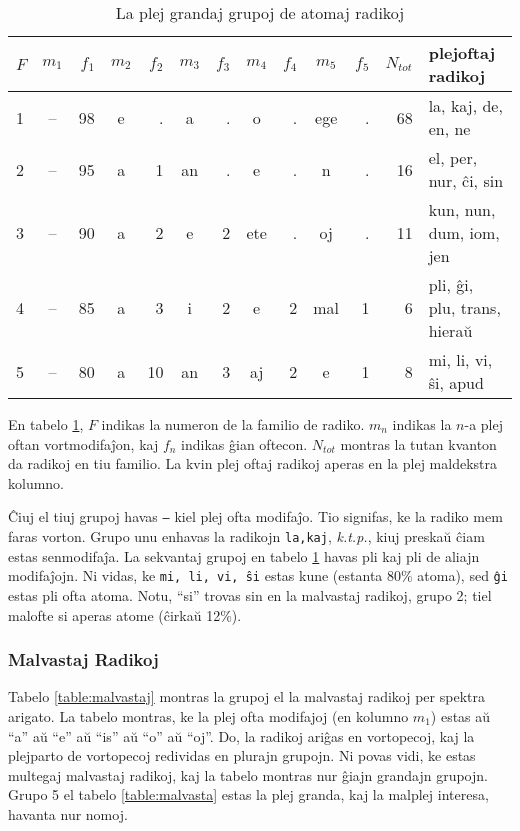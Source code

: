 \documentclass[12pt,twoside]{article}
\begin{document}
\vspace{.2 in}
\begin{table}[h!]
\begin{center}
\begin{tabular}{ |l||c|r||c|r||c|r||c|r||c|r||r|l| }
\hline
$F$& $m_1$ & $f_1$&$m_2$ & $f_2$&$m_3$ & $f_3$& $m_4$  & $f_4$& $m_5$ & $f_5$& $N_{tot}$ &   plejoftaj radikoj     \\
\hline
1   &--  &98   &e    &.   &a    &.    &o    &.  &ege    &.  &68          &la, kaj, de, en, ne \\
2   &--  &95   &a    &1  &an    &.    &e    &.    &n    &.  &16        &el, per, nur, ĉi, sin \\
3   &--  &90   &a    &2   &e    &2  &ete    &.   &oj    &.  &11      &kun, nun, dum, iom, jen \\
4   &--  &85   &a    &3   &i    &2    &e    &2  &mal    &1   &6  &pli, ĝi, plu, trans, hieraŭ \\
5   &--  &80   &a   &10  &an    &3   &aj    &2    &e    &1   &8         &mi, li, vi, ŝi, apud \\
\hline
\end{tabular}
\caption{La plej grandaj grupoj de atomaj radikoj}\label{table:atomoj}
\end{center}
\end{table}
\vspace{.2 in}

En tabelo \ref{table:atomoj}, $F$ indikas la numeron de la familio de radiko. $m_n$ indikas la $n$-a plej oftan vortmodifaĵon, 
kaj $f_n$ indikas ĝian oftecon. $N_{tot}$ montras la tutan kvanton da radikoj en tiu familio. La kvin plej oftaj
radikoj aperas en la plej maldekstra kolumno.

Ĉiuj el tiuj grupoj havas \texttt{--} kiel plej ofta modifaĵo. Tio signifas, ke la radiko mem faras 
vorton. Grupo unu enhavas la radikojn \texttt{la,kaj}, \textit{k.t.p.}, kiuj preskaŭ ĉiam estas senmodifaĵa.
La sekvantaj grupoj en tabelo \ref{table:atomoj} havas pli kaj pli de aliajn modifaĵojn. Ni vidas,
ke \texttt{mi, li, vi, ŝi} estas kune (estanta 80\% atoma), sed \texttt{ĝi} estas pli ofta atoma.  
Notu, ``si'' trovas sin en la malvastaj radikoj, grupo 2; tiel malofte si aperas atome (ĉirkaŭ 12\%).

\subsubsection{Malvastaj Radikoj}
Tabelo \ref{table:malvastaj} montras la grupoj el la malvastaj radikoj per spektra arigato. 
La tabelo montras, ke la plej ofta modifajoj (en kolumno $m_1$) estas aŭ ``a'' aŭ ``e'' aŭ ``is'' aŭ ``o'' aŭ ``oj''.
Do, la radikoj ariĝas en vortopecoj, kaj la plejparto de vortopecoj redividas en plurajn grupojn.
Ni povas vidi, ke estas multegaj malvastaj radikoj, kaj la tabelo montras nur ĝiajn grandajn grupojn.
Grupo 5 el tabelo \ref{table:malvasta} estas la plej granda, kaj la malplej interesa, havanta nur nomoj.
\end{document}
